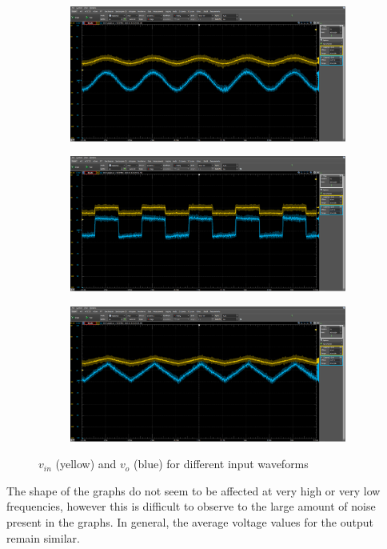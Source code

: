 \documentclass[12pt]{article}
\begin{document}
\begin{enumerate}
\begin{enumerate}
\begin{figure}[h!]
\begin{subfigure}[b]{0.31\textwidth}
                \includegraphics[width=\textwidth]{MeasurementsSine.png}
            \end{subfigure}
            \!
            \begin{subfigure}[b]{0.31\textwidth}
                \includegraphics[width=\textwidth]{MeasurementsSquare.png}
            \end{subfigure}
            \!
            \begin{subfigure}[b]{0.31\textwidth}
                \includegraphics[width=\textwidth]{MeasurementsTriangle.png}
            \end{subfigure}
            \caption{$v_{in}$ (yellow) and $v_o$ (blue) for different input waveforms}
            \label{fig:MeasurementShapes}
        \end{figure} \newpage
        The shape of the graphs do not seem to be affected at very high or very low frequencies, however this is difficult to observe to the large amount of noise present in the graphs. In general, the average voltage values for the output remain similar.


\end{enumerate}
\end{enumerate}
\end{document}
